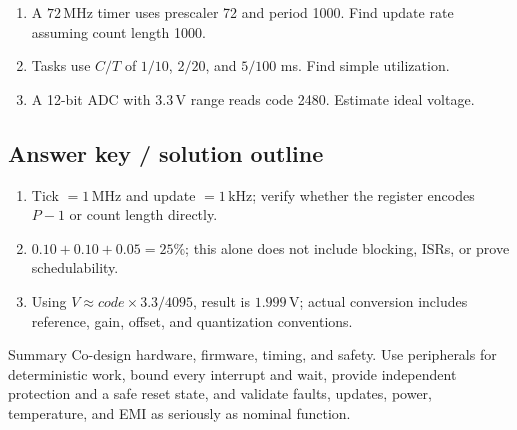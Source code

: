 \documentclass[10pt,letterpaper]{article}
\begin{document}
\begin{enumerate}
  \item A $72\,\mathrm{MHz}$ timer uses prescaler 72 and period 1000. Find update rate assuming count length 1000.
  \item Tasks use $C/T$ of $1/10$, $2/20$, and $5/100$ ms. Find simple utilization.
  \item A 12-bit ADC with $3.3\,\mathrm{V}$ range reads code 2480. Estimate ideal voltage.
\end{enumerate}\subsection{Answer key / solution outline}
\begin{enumerate}
  \item Tick $=1\,\mathrm{MHz}$ and update $=1\,\mathrm{kHz}$; verify whether the register encodes $P-1$ or count length directly.
  \item $0.10+0.10+0.05=25\%$; this alone does not include blocking, ISRs, or prove schedulability.
  \item Using $V\approx code\times3.3/4095$, result is $1.999\,\mathrm{V}$; actual conversion includes reference, gain, offset, and quantization conventions.
\end{enumerate}\begin{CornellSummaryBox}{Summary}
Co-design hardware, firmware, timing, and safety. Use peripherals for deterministic work, bound every interrupt and wait, provide independent protection and a safe reset state, and validate faults, updates, power, temperature, and EMI as seriously as nominal function.
\end{CornellSummaryBox}
\end{document}
